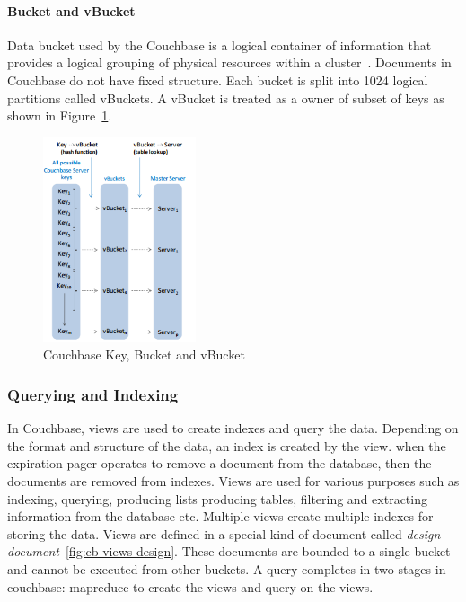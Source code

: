\paragraph{Bucket and vBucket}
 Data bucket used by the Couchbase is a logical container of information that provides a logical grouping of physical resources within a cluster~\citep{lichtenberg2013nosql}. Documents in Couchbase do not have fixed structure. Each bucket is split into 1024 logical partitions called vBuckets. A vBucket is treated as a owner of subset of keys as shown in Figure~\ref{fig:cb-vbucket}.  

\begin{figure}[h]
	\centering
	\includegraphics[width=0.4\textwidth]{img/vbucket2}
	\caption{ Couchbase Key, Bucket and   vBucket ~\cite{couchbasedocs}}
	\label{fig:cb-vbucket}
\end{figure}




\subsubsection{Querying and Indexing}

 In Couchbase, views are used to create indexes and query the data. Depending on the format and structure of the data, an index is created by the view. when the expiration pager operates to remove a document from the database, then the documents are removed from indexes. Views are used for various purposes such as indexing, querying, producing lists producing tables, filtering and extracting information from the database etc. Multiple views create multiple indexes for storing the data. Views are defined in a special kind of document called \textit{design document}~\ref{fig:cb-views-design}. These documents are bounded to a single bucket and cannot be executed from other buckets. A query completes in two stages in couchbase: mapreduce to create the views and query on the views.
 
